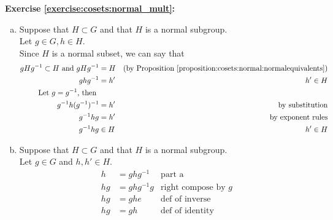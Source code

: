 \noindent\textbf{Exercise \ref{exercise:cosets:normal_mult}:}
\begin{enumerate}[(a)]
\item
Suppose that $H \subset G$ and that $H$ is a normal subgroup.  
\\
Let $g \in G, h \in H$.
\\
Since $H$ is a normal subset, we can say that 
\begin{align*}
gHg^{-1} \subset H \text{\ and\ } gHg^{-1} &= H &\text{(by Proposition~\ref{proposition:cosets:normal:normalequivalents})}
\\
ghg^{-1} &= h' &h' \in H
\\
\text{Let\ } g = g^{-1}\text{, then\ } 
\\
g^{-1}h(g^{-1})^{-1} &= h' &\text{by substitution}
\\
g^{-1}hg &= h' &\text{by exponent rules}
\\
g^{-1}hg &\in H &h' \in H 
\end{align*}

\item
Suppose that $H \subset G$ and that $H$ is a normal subgroup.  
\\
Let $g \in G$ and $h, h' \in H$.
\\
\begin{align*}
h &= ghg^{-1} &\text{part a}
\\
hg &= ghg^{-1}g &\text{right compose by\ } g
\\
hg &= ghe &\text{def of inverse}
\\
hg &= gh &\text{def of identity}
\end{align*}


\end{enumerate}
